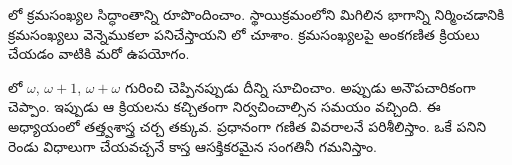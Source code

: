 \documentclass[../../../include/open-logic-section]{subfiles}
\begin{document}


లో క్రమసంఖ్యల సిద్ధాంతాన్ని రూపొందించాం.
స్థాయిక్రమంలోని మిగిలిన భాగాన్ని నిర్మించడానికి క్రమసంఖ్యలు
వెన్నెముకలా పనిచేస్తాయని లో చూశాం.
క్రమసంఖ్యలపై అంకగణిత క్రియలు చేయడం వాటికి మరో ఉపయోగం.

లో $\omega$, $\omega+1$,
$\omega+\omega$ గురించి చెప్పినప్పుడు దీన్ని సూచించాం.
అప్పుడు అనౌపచారికంగా చెప్పాం. ఇప్పుడు ఆ క్రియలను కచ్చితంగా నిర్వచించాల్సిన
సమయం వచ్చింది. ఈ అధ్యాయంలో తత్త్వశాస్త్ర చర్చ తక్కువ.
ప్రధానంగా గణిత వివరాలనే పరిశీలిస్తాం. ఒకే పనిని రెండు విధాలుగా
చేయవచ్చనే కాస్త ఆసక్తికరమైన సంగతినీ గమనిస్తాం.
\end{document}
